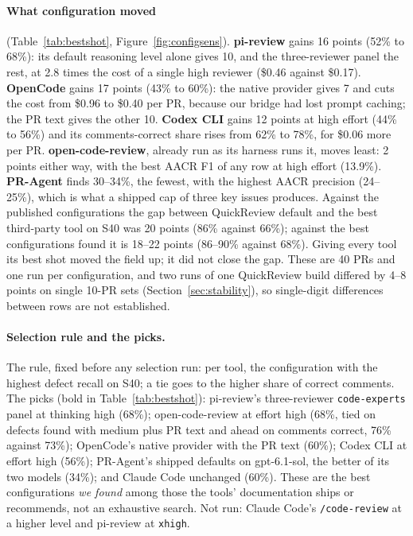 \documentclass[11pt,a4paper]{article}
\newcommand{\qcr}{QuickReview}
\newcommand{\code}[1]{\texttt{#1}}
\begin{document}
\paragraph{What configuration moved} (Table~\ref{tab:bestshot},
Figure~\ref{fig:configsens}). \textbf{pi-review} gains 16 points (52\% to
68\%): its default reasoning level alone gives 10, and the three-reviewer
panel the rest, at 2.8 times the cost of a single high reviewer (\$0.46
against \$0.17). \textbf{OpenCode} gains 17 points (43\% to 60\%): the
native provider gives 7 and cuts the cost from \$0.96 to \$0.40 per PR,
because our bridge had lost prompt caching; the PR text gives the other 10.
\textbf{Codex CLI} gains 12 points at high effort (44\% to 56\%) and its
comments-correct share rises from 62\% to 78\%, for \$0.06 more per PR.
\textbf{open-code-review}, already run as its harness runs it, moves least:
2 points either way, with the best AACR F1 of any row at high effort
(13.9\%). \textbf{PR-Agent} finds 30--34\%, the fewest, with the highest AACR
precision (24--25\%), which is what a shipped cap of three key issues
produces. Against the published configurations the gap between \qcr{}
default and the best third-party tool on S40 was 20 points (86\% against
66\%); against the best configurations found it is 18--22 points (86--90\%
against 68\%). Giving every tool its best shot moved the field up; it did
not close the gap. These are 40 PRs and one run per configuration, and two
runs of one \qcr{} build differed by 4--8 points on single 10-PR sets
(Section~\ref{sec:stability}), so single-digit differences between rows are
not established.

\paragraph{Selection rule and the picks.} The rule, fixed before any
selection run: per tool, the configuration with the highest defect recall
on S40; a tie goes to the higher share of correct comments. The picks (bold
in Table~\ref{tab:bestshot}): pi-review's three-reviewer \code{code-experts}
panel at thinking high (68\%); open-code-review at effort high (68\%, tied on
defects found with medium plus PR text and ahead on comments correct, 76\%
against 73\%); OpenCode's native provider with the PR text (60\%); Codex CLI
at effort high (56\%); PR-Agent's shipped defaults on gpt-6.1-sol, the better
of its two models (34\%); and Claude Code unchanged (60\%). These are the
best configurations \emph{we found} among those the tools' documentation
ships or recommends, not an exhaustive search. Not run: Claude Code's
\code{/code-review} at a higher level and pi-review at \code{xhigh}.
\end{document}
